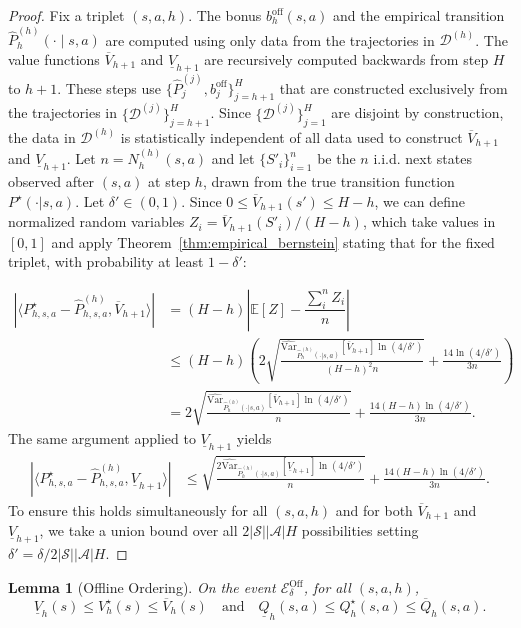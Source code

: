 \documentclass[twoside]{article}
\newtheorem{lemma}{Lemma}
\newcommand{\off}{\mathrm{off}} %
\newcommand{\boff}{b_h^{\off}} %
\newcommand{\boffp}[1]{b_{#1}^{\off}} %
\newcommand{\ohighv}{\overline{V}} %
\newcommand{\olowv}{\underline{V}} %
\begin{document}
\begin{proof}
Fix a triplet $(s,a,h)$. The bonus $\boff(s,a)$ and the empirical transition $\widehat{P}_h^{(h)}(\cdot\mid s,a)$ are computed using only data from the trajectories in $\mathcal{D}^{(h)}$. The value functions $\ohighv_{h+1}$ and $\olowv_{h+1}$ are recursively computed backwards from step $H$ to $h+1$. These steps use $\{\widehat{P}_j^{(j)}, \boffp{j}\}_{j=h+1}^H$ that are constructed exclusively from the trajectories in $\{\mathcal{D}^{(j)}\}_{j=h+1}^H$. Since $\{\mathcal{D}^{(j)}\}_{j=1}^H$ are disjoint by construction, the data in $\mathcal{D}^{(h)}$ is statistically independent of all data used to construct $\ohighv_{h+1}$ and $\olowv_{h+1}$.
Let $n = N_h^{(h)}(s,a)$ and let $\{S'_i\}_{i=1}^n$ be the $n$ i.i.d. next states observed after $(s,a)$ at step $h$, drawn from the true transition function $P^\star(\cdot|s,a)$. Let $\delta'\in(0,1)$.
Since $0 \le \ohighv_{h+1}(s') \le H-h$, we can define normalized random variables $Z_i = \ohighv_{h+1}(S'_i)/(H-h)$, which take values in $[0,1]$ and apply Theorem~\ref{thm:empirical_bernstein} stating that for the fixed triplet, with probability at least $1 - \delta'$:

\begin{align*}
|\langle P_{h,s,a}^\star - \widehat{P}_{h,s,a}^{(h)},\ohighv_{h+1}\rangle| & = (H-h)\left|\mathbb{E}[Z] - \dfrac{\sum_{i}^{n} Z_i}{n}\right| \\
& \le (H-h) \left( 2\sqrt{\frac{\widehat{\mathrm{Var}}_{\widehat{P}^{(h)}_h(\cdot|s,a)}[\ohighv_{h+1}] \ln(4/\delta')}{(H-h)^2 n}} + \frac{14 \ln(4/\delta')}{3n} \right) \\
& = 2\sqrt{\frac{\widehat{\mathrm{Var}}_{\widehat{P}^{(h)}_h(\cdot|s,a)}[\ohighv_{h+1}] \ln(4/\delta')}{n}} + \frac{14(H-h)\ln(4/\delta')}{3n}.
\end{align*}
The same argument applied to $\olowv_{h+1}$ yields 
\begin{align*}
|\langle P_{h,s,a}^\star - \widehat{P}_{h,s,a}^{(h)}, \olowv_{h+1} \rangle| 
& \leq \sqrt{\frac{2 \widehat{\mathrm{Var}}_{\widehat{P}^{(h)}_h(\cdot|s,a)}[\olowv_{h+1}] \ln(4/\delta')}{n}} + \frac{14(H-h)\ln(4/\delta')}{3n}.
\end{align*}
To ensure this holds simultaneously for all $(s,a,h)$ and for both $\ohighv_{h+1}$ and $\olowv_{h+1}$, we take a union bound over all $2|\mathcal{S}||\mathcal{A}|H$ possibilities setting $\delta' = \delta/2|\mathcal{S}||\mathcal{A}|H$.
\end{proof}

\begin{lemma}[Offline Ordering]
On the event $\mathcal E^{\mathrm{Off}}_{\delta}$, for all $(s,a,h)$,
\[
\underline V_h(s)\le V_h^\star(s)\le \overline V_h(s)
\quad\text{and}\quad
\underline Q_h(s,a)\le Q_h^\star(s,a)\le \overline Q_h(s,a).
\]
\end{lemma}
\end{document}
